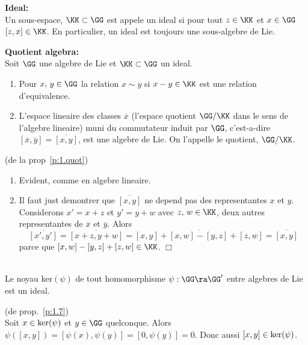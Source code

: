 \begin{ddd}{\bf Ideal:}\\
Un sous-espace, $\KK \subset \GG$ est appele un ideal si pour tout $z\in \KK$ et $x\in \GG$
$[z,x]\in \KK$. En particulier, un ideal est toujours une sous-algebre de Lie.
\end{ddd}

\begin{ppp}{\bf Quotient algebra:}\\ \label{p:1.quot}
Soit $\GG$ une algebre de Lie et $\KK \subset \GG$ un ideal.\\
\begin{enumerate}
\item Pour $x,\, y\in \GG$ la relation $x\sim y$ si $x-y\in \KK$ est une relation d'equivalence.
\item L'espace lineaire des classes $\overline x$  (l'espace quotient $\GG/\KK$ dans le sens de l'algebre lineaire)
muni du commutateur induit par $\GG$, c'est-a-dire $ [\overline x,\overline y] =   \overline{[x,y]}$, est une algebre
de Lie. On l'appelle le quotient, $\GG/\KK$.
\end{enumerate}
\end{ppp}
\begin{prv} (de la prop~\ref{p:1.quot})
\begin{enumerate}
\item Evident, comme en algebre lineaire.
\item Il faut just demontrer que $ \overline{[x,y]}$ ne depend pas des representantes $x$ et $y$. 
Considerons $x' = x+z$ et $y'=y+w$ avec $z,\,w\in\KK$, deux autres representantes de $\overline x$ et $\overline y$.
Alors $$ \overline{[x',y']} = \overline{[x+z,y+w]} = \overline{[x,y] + [x,w]-[y,z]+[z,w]} =  \overline{[x,y]}$$ parce que
$ [x,w]-[y,z]+[z,w] \in \KK$. \hfill $\Box$
\end{enumerate}
\end{prv}

\begin{ppp}~ \label{p:1.7} \\
Le noyau ker$(\psi)$ de tout homomorphisme $\psi : \GG \ra \GG'$ entre algebres de Lie
 est un ideal. 
\end{ppp}
\begin{prv}(de prop.~\ref{p:1.7})\\
Soit $x\in {\rm ker}(\psi)$ et $y\in\GG$ quelconque. Alors $\psi([x,y]) = [\psi(x),\psi(y)]=
[0,\psi(y)] = 0$. Donc aussi $[x,y]\in {\rm ker}(\psi)$.
\end{prv}

